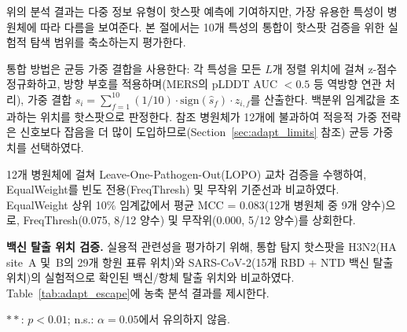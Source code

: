 위의 분석 결과는 다중 정보 유형이 핫스팟 예측에 기여하지만, 가장 유용한 특성이 병원체에 따라 다름을 보여준다. 본 절에서는 10개 특성의 통합이 핫스팟 검증을 위한 실험적 탐색 범위를 축소하는지 평가한다.

통합 방법은 균등 가중 결합을 사용한다: 각 특성을 모든 $L$개 정렬 위치에 걸쳐 z-점수 정규화하고, 방향 부호를 적용하며(MERS의 pLDDT AUC $< 0.5$ 등 역방향 연관 처리), 가중 결합 $s_i = \sum_{f=1}^{10} (1/10) \cdot \mathrm{sign}(\hat{s}_f) \cdot z_{i,f}$를 산출한다. 백분위 임계값을 초과하는 위치를 핫스팟으로 판정한다. 참조 병원체가 12개에 불과하여 적응적 가중 전략은 신호보다 잡음을 더 많이 도입하므로(Section~\ref{sec:adapt_limits} 참조) 균등 가중치를 선택하였다.

12개 병원체에 걸쳐 Leave-One-Pathogen-Out(LOPO) 교차 검증을 수행하여, EqualWeight를 빈도 전용(FreqThresh) 및 무작위 기준선과 비교하였다.
EqualWeight 상위 10\% 임계값에서 평균 MCC = 0.083(12개 병원체 중 9개 양수)으로, FreqThresh(0.075, 8/12 양수) 및 무작위(0.000, 5/12 양수)를 상회한다.

\textbf{백신 탈출 위치 검증.}
실용적 관련성을 평가하기 위해, 통합 탐지 핫스팟을 H3N2(HA site~A 및~B의 29개 항원 표류 위치)와 SARS-CoV-2(15개 RBD + NTD 백신 탈출 위치)의 실험적으로 확인된 백신/항체 탈출 위치와 비교하였다.
Table~\ref{tab:adapt_escape}에 농축 분석 결과를 제시한다.

\begin{table}[htbp]
\centering
\caption{백신 탈출 위치 검증(상위 5\% 임계값). 농축비(Enrichment)는 무작위 배정 대비 관찰된 중첩과 기대 중첩의 비율이다. $p$-값은 Fisher의 정확 검정에 의한다.}
\label{tab:adapt_escape}
\begin{minipage}{\textwidth}
\smallskip
\footnotesize $**$: $p < 0.01$; n.s.: $\alpha = 0.05$에서 유의하지 않음.
\end{minipage}
\end{table}


